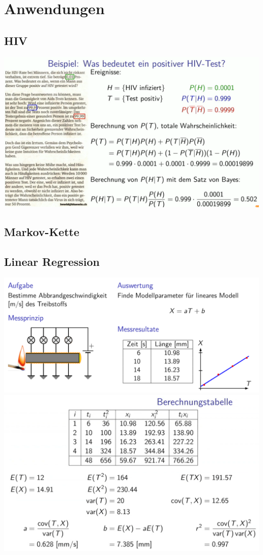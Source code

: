 \section{Anwendungen}
\subsection{HIV}
\includegraphics[width=\linewidth]{Images/HIV}

\subsection{Markov-Kette}


\subsection{Linear Regression}
\includegraphics[width=\linewidth]{Images/linear_regression1}
\includegraphics[width=\linewidth]{Images/linear_regression}

